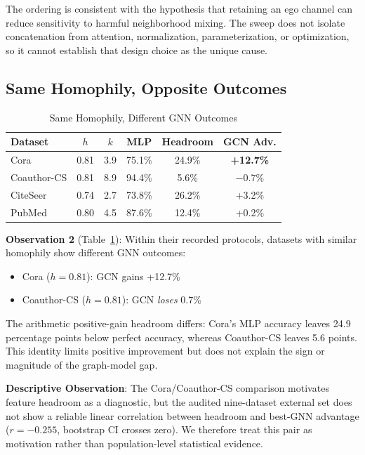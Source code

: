 The ordering is consistent with the hypothesis that retaining an ego channel can reduce sensitivity to harmful neighborhood mixing. The sweep does not isolate concatenation from attention, normalization, parameterization, or optimization, so it cannot establish that design choice as the unique cause.

\subsection{Same Homophily, Opposite Outcomes}

\begin{table}[t]
\centering
\caption{Same Homophily, Different GNN Outcomes}
\label{tab:same_h}
\begin{tabular}{@{}lccccc@{}}
\toprule
\textbf{Dataset} & \textbf{$h$} & \textbf{$k$} & \textbf{MLP} & \textbf{Headroom} & \textbf{GCN Adv.} \\
\midrule
Cora & 0.81 & 3.9 & 75.1\% & 24.9\% & \textbf{+12.7\%} \\
Coauthor-CS & 0.81 & 8.9 & 94.4\% & 5.6\% & $-0.7\%$ \\
\midrule
CiteSeer & 0.74 & 2.7 & 73.8\% & 26.2\% & +3.2\% \\
PubMed & 0.80 & 4.5 & 87.6\% & 12.4\% & +0.2\% \\
\bottomrule
\end{tabular}
\end{table}

\textbf{Observation 2} (Table~\ref{tab:same_h}): Within their recorded protocols, datasets with similar homophily show different GNN outcomes:
\begin{itemize}
    \item Cora ($h=0.81$): GCN gains +12.7\%
    \item Coauthor-CS ($h=0.81$): GCN \textit{loses} 0.7\%
\end{itemize}

The arithmetic positive-gain headroom differs: Cora's MLP accuracy leaves 24.9 percentage points below perfect accuracy, whereas Coauthor-CS leaves 5.6 points. This identity limits positive improvement but does not explain the sign or magnitude of the graph-model gap.

\textbf{Descriptive Observation}: The Cora/Coauthor-CS comparison motivates feature headroom as a diagnostic, but the audited nine-dataset external set does not show a reliable linear correlation between headroom and best-GNN advantage ($r=-0.255$, bootstrap CI crosses zero). We therefore treat this pair as motivation rather than population-level statistical evidence.

